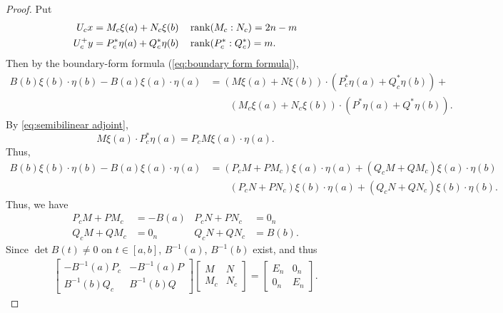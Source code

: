 \documentclass[11pt, oneside, a4paper]{article}
\begin{document}
\begin{proof}
{    Put
    \begin{align*}
        U_cx &= M_c\xi(a) + N_c\xi(b)\quad \operatorname{rank}(M_c:N_c) = 2n-m\\
        U_c^+y &= P_c^*\eta(a) + Q_c^*\eta(b)\quad\operatorname{rank}(P_c^*:Q_c^*)=m.
    \end{align*}
    Then by the boundary-form formula (\ref{eq:boundary form formula}),
    \begin{align*}
        B(b)\xi(b)\cdot \eta(b) - B(a)\xi(a)\cdot \eta(a) &= (M\xi(a) + N\xi(b))\cdot (P_c^*\eta(a) + Q_c^*\eta(b)) + \\
        &\qquad (M_c\xi(a) + N_c\xi(b))\cdot (P^*\eta(a) + Q^*\eta(b)).
    \end{align*}
    By \ref{eq:semibilinear adjoint}, 
    \[M\xi(a)\cdot P_c^*\eta(a) = P_cM\xi(a)\cdot \eta(a).\]
    Thus,
    \begin{align*}
        B(b)\xi(b)\cdot \eta(b) - B(a)\xi(a)\cdot \eta(a) &= (P_c M + PM_c)\xi(a)\cdot \eta(a) + (Q_cM + QM_c)\xi(a)\cdot \eta(b) \\
        &\qquad (P_cN + PN_c) \xi(b)\cdot \eta(a) + (Q_cN + QN_c) \xi(b)\cdot \eta(b).
    \end{align*}
    }
    Thus, we have
    \begin{align*}
        P_cM + PM_c &= - B(a) & P_cN + PN_c &= 0_n\\
        Q_cM + QM_c &= 0_n & Q_cN + QN_c &= B(b).
    \end{align*}
    Since $\det B(t)\neq 0$ on $t\in[a,b]$, $B^{-1}(a)$, $B^{-1}(b)$ exist, and thus
    \begin{align*}
        \begin{bmatrix}
            -B^{-1}(a)P_c & -B^{-1}(a)P\\
            B^{-1}(b)Q_c & B^{-1}(b)Q
        \end{bmatrix}
        \begin{bmatrix}
            M & N\\
            M_c & N_c
        \end{bmatrix}
        =
        \begin{bmatrix}
            E_n & 0_n\\
            0_n & E_n
        \end{bmatrix}.
    \end{align*}
\end{proof}
\end{document}
